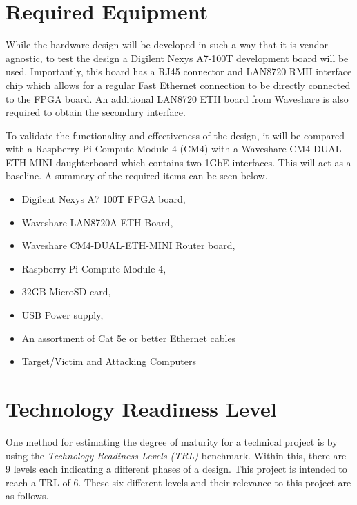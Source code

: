\section{Required Equipment}
While the hardware design will be developed in such a way that it is vendor-agnostic, to test the design a Digilent Nexys A7-100T development board will be used.
Importantly, this board has a RJ45 connector and LAN8720 RMII interface chip which allows for a regular Fast Ethernet connection to be directly connected 
to the FPGA board. An additional LAN8720 ETH board from Waveshare is also required to obtain the secondary interface. 

To validate the functionality and effectiveness of the design, it will be compared with a Raspberry Pi Compute Module 4 (CM4) with a Waveshare CM4-DUAL-ETH-MINI 
daughterboard which contains two 1GbE interfaces. This will act as a baseline. A summary of the required items can be seen below.

\begin{itemize}
    \item Digilent Nexys A7 100T FPGA board,
    \item Waveshare LAN8720A ETH Board,
    \item Waveshare CM4-DUAL-ETH-MINI Router board,
    \item Raspberry Pi Compute Module 4,
    \item 32GB MicroSD card,
    \item USB Power supply,
    \item An assortment of Cat 5e or better Ethernet cables
    \item Target/Victim and Attacking Computers
\end{itemize}


\section{Technology Readiness Level}

One method for estimating the degree of maturity for a technical project is by using the \textit{Technology Readiness Levels (TRL)} benchmark. Within this, 
there are 9 levels each indicating a different phases of a design. This project is intended to reach a TRL of 6. These six different levels and their 
relevance to this project are as follows. 

